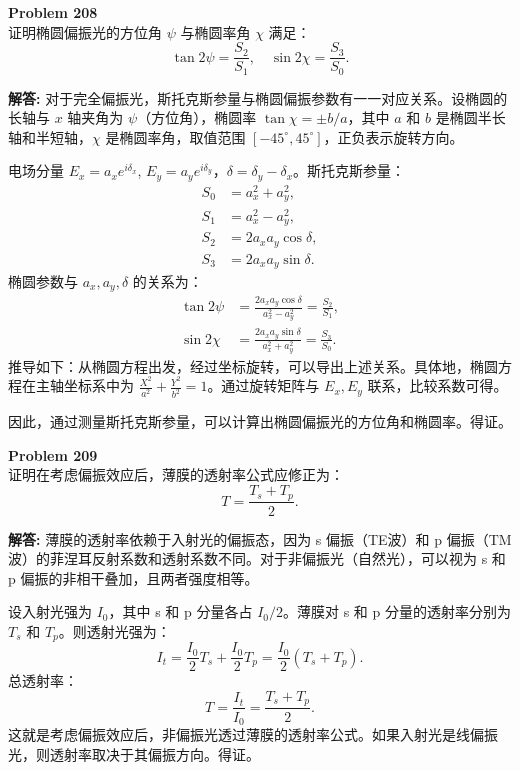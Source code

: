 \documentclass[12pt, a4paper, oneside]{ctexart}
\newenvironment{solution}{\par\noindent\textbf{解答:}\quad}{\par}
\begin{document}
\begin{mdframed}[backgroundcolor=gray!10, linewidth=0pt]
    \textbf{Problem 208} \\
    证明椭圆偏振光的方位角 $\psi$ 与椭圆率角 $\chi$ 满足：
    \[
    \tan 2\psi = \frac{S_2}{S_1}, \quad \sin 2\chi = \frac{S_3}{S_0}.
    \]
\end{mdframed}
\begin{solution}
    对于完全偏振光，斯托克斯参量与椭圆偏振参数有一一对应关系。设椭圆的长轴与 $x$ 轴夹角为 $\psi$（方位角），椭圆率 $\tan\chi = \pm b/a$，其中 $a$ 和 $b$ 是椭圆半长轴和半短轴，$\chi$ 是椭圆率角，取值范围 $[-45^\circ, 45^\circ]$，正负表示旋转方向。

    电场分量 $E_x = a_x e^{i\delta_x}$, $E_y = a_y e^{i\delta_y}$，$\delta = \delta_y - \delta_x$。斯托克斯参量：
    \begin{align*}
        S_0 &= a_x^2 + a_y^2, \\
        S_1 &= a_x^2 - a_y^2, \\
        S_2 &= 2 a_x a_y \cos\delta, \\
        S_3 &= 2 a_x a_y \sin\delta.
    \end{align*}
    椭圆参数与 $a_x, a_y, \delta$ 的关系为：
    \begin{align*}
        \tan 2\psi &= \frac{2 a_x a_y \cos\delta}{a_x^2 - a_y^2} = \frac{S_2}{S_1}, \\
        \sin 2\chi &= \frac{2 a_x a_y \sin\delta}{a_x^2 + a_y^2} = \frac{S_3}{S_0}.
    \end{align*}
    推导如下：从椭圆方程出发，经过坐标旋转，可以导出上述关系。具体地，椭圆方程在主轴坐标系中为 $\frac{X^2}{a^2} + \frac{Y^2}{b^2} = 1$。通过旋转矩阵与 $E_x, E_y$ 联系，比较系数可得。

    因此，通过测量斯托克斯参量，可以计算出椭圆偏振光的方位角和椭圆率。得证。
\end{solution}

\begin{mdframed}[backgroundcolor=gray!10, linewidth=0pt]
    \textbf{Problem 209} \\
    证明在考虑偏振效应后，薄膜的透射率公式应修正为：
    \[
    T = \frac{T_s + T_p}{2}.
    \]
\end{mdframed}
\begin{solution}
    薄膜的透射率依赖于入射光的偏振态，因为 s 偏振（TE波）和 p 偏振（TM波）的菲涅耳反射系数和透射系数不同。对于非偏振光（自然光），可以视为 s 和 p 偏振的非相干叠加，且两者强度相等。

    设入射光强为 $I_0$，其中 s 和 p 分量各占 $I_0/2$。薄膜对 s 和 p 分量的透射率分别为 $T_s$ 和 $T_p$。则透射光强为：
    \[
    I_t = \frac{I_0}{2} T_s + \frac{I_0}{2} T_p = \frac{I_0}{2} (T_s + T_p).
    \]
    总透射率：
    \[
    T = \frac{I_t}{I_0} = \frac{T_s + T_p}{2}.
    \]
    这就是考虑偏振效应后，非偏振光透过薄膜的透射率公式。如果入射光是线偏振光，则透射率取决于其偏振方向。得证。
\end{solution}
\end{document}
